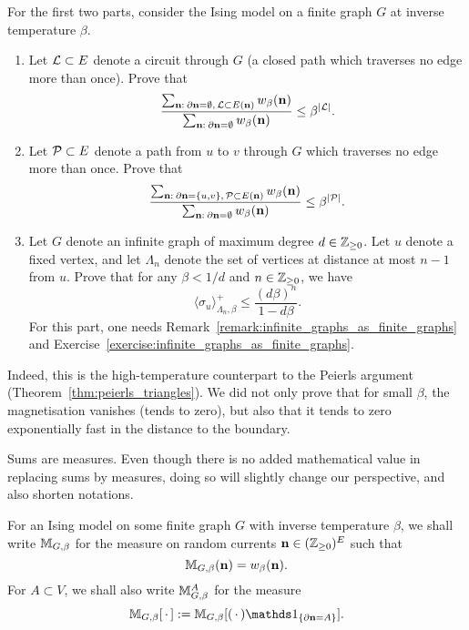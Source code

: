 \begin{exercise}
    \label{exercise:currents_peierls}
    For the first two parts, consider
    the Ising model on a finite graph $G$ at inverse temperature $\beta$.
    \begin{enumerate}
        \item Let $\mathcal L\subset E$ denote a circuit through $G$
        (a closed path which traverses no edge more than once).
        Prove that
        \[
            \frac{
                \sum_{\mathbf{n}:\:\partial\mathbf{n}=\emptyset,\,\mathcal L\subset E(\mathbf{n})} w_\beta(\mathbf{n})
            }{
                \sum_{\mathbf{n}:\:\partial\mathbf{n}=\emptyset} w_\beta(\mathbf{n})
            }
            \leq
            \beta^{|\mathcal L|}.
        \]
        \item Let $\mathcal P\subset E$ denote a path from $u$ to $v$ through $G$
        which traverses no edge more than once.
        Prove that
        \[
            \frac{
                \sum_{\mathbf{n}:\:\partial\mathbf{n}=\{u,v\},\,\mathcal P\subset E(\mathbf{n})} w_\beta(\mathbf{n})
            }{
                \sum_{\mathbf{n}:\:\partial\mathbf{n}=\emptyset} w_\beta(\mathbf{n})
            }
            \leq
            \beta^{|\mathcal P|}.
        \]
        \item Let $G$ denote an infinite graph of maximum degree $d\in\mathbb Z_{\geq 0}$.
        Let $u$ denote a fixed vertex, and let $\Lambda_n$ denote the set of vertices
        at distance at most $n-1$ from $u$.
        Prove that for any $\beta<1/d$ and $n\in\mathbb Z_{\geq 0}$, we have
        \[
            \langle\sigma_u\rangle_{\Lambda_n,\beta}^+
            \leq
            \frac{(d\beta)^n}{1-d\beta}.
        \]
        For this part, one needs Remark~\ref{remark:infinite_graphs_as_finite_graphs}
        and Exercise~\ref{exercise:infinite_graphs_as_finite_graphs}.
    \end{enumerate}
    Indeed, this is the high-temperature counterpart to the Peierls argument
    (Theorem~\ref{thm:peierls_triangles}).
    We did not only prove that for small $\beta$, the magnetisation vanishes
    (tends to zero),
    but also that it tends to zero exponentially fast in the distance to the boundary.
\end{exercise}

\begin{definition}
    Sums are measures.
    Even though there is no added mathematical value in replacing sums by measures,
    doing so will slightly change our perspective,
    and also shorten notations.

    For an Ising model on some finite graph $G$ with inverse temperature
    $\beta$, we shall write
    \(
        \mathbb M_{G,\beta}
    \)
    for the measure on random currents $\mathbf{n}\in(\mathbb Z_{\geq 0})^E$
    such that
    \[
        \mathbb M_{G,\beta}(\mathbf{n})=w_\beta(\mathbf{n}).
    \]
    For $A\subset V$, we shall also write $\mathbb M_{G,\beta}^A$
    for the measure
    \[
        \M_{G,\beta}[\blank]:=\M_{G,\beta}[(\blank)\ind{\{\partial\n=A\}}].
    \]
\end{definition}

